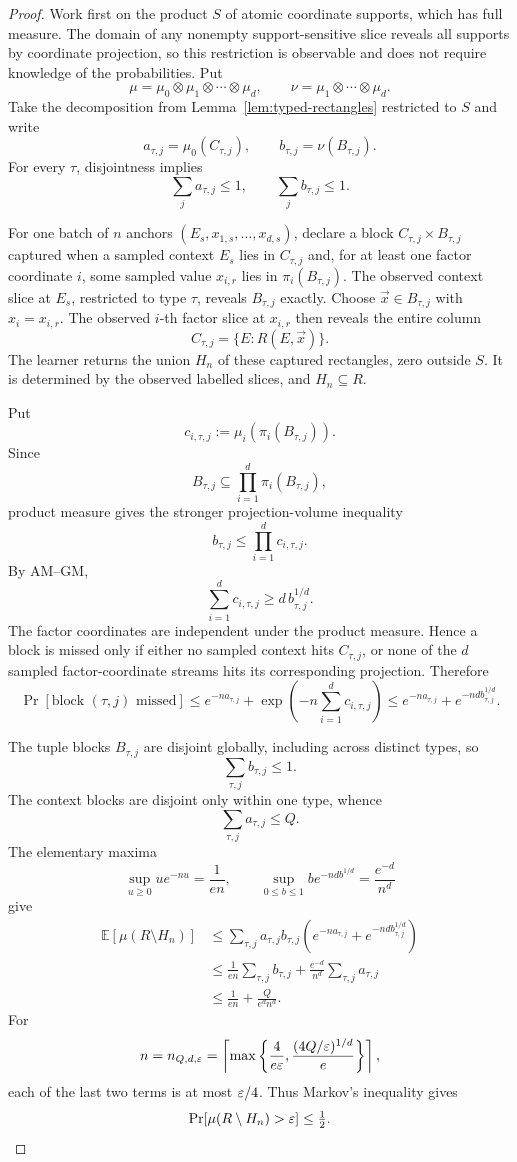 \begin{proof}
Work first on the product \(S\) of atomic coordinate supports,
which has full measure.  The domain of any nonempty
support-sensitive slice reveals all supports by coordinate
projection, so this restriction is observable and does not
require knowledge of the probabilities.
Put
\[
 \mu=\mu_0\otimes\mu_1\otimes\cdots\otimes\mu_d,
 \qquad \nu=\mu_1\otimes\cdots\otimes\mu_d.
\]
Take the decomposition from
Lemma~\ref{lem:typed-rectangles} restricted to \(S\) and write
\[
 a_{\tau,j}=\mu_0(C_{\tau,j}),\qquad
 b_{\tau,j}=\nu(B_{\tau,j}).
\]
For every \(\tau\), disjointness implies
\[
 \sum_j a_{\tau,j}\le 1,\qquad
 \sum_j b_{\tau,j}\le 1.
\]

For one batch of \(n\) anchors
\((E_s,x_{1,s},\ldots,x_{d,s})\), declare a block
\(C_{\tau,j}\times B_{\tau,j}\) captured when
a sampled context \(E_s\) lies in \(C_{\tau,j}\)
and, for at least one factor coordinate \(i\),
some sampled value \(x_{i,r}\) lies in
\(\pi_i(B_{\tau,j})\).  The observed context slice
at \(E_s\), restricted to type \(\tau\), reveals
\(B_{\tau,j}\) exactly.  Choose
\(\vec x\in B_{\tau,j}\) with \(x_i=x_{i,r}\).
The observed \(i\)-th factor slice at \(x_{i,r}\)
then reveals the entire column
\[
 C_{\tau,j}=\{E:R(E,\vec x)\}.
\]
The learner returns the union \(H_n\) of these
captured rectangles, zero outside \(S\).
It is determined by the observed labelled slices,
and \(H_n\subseteq R\).

Put
\[
 c_{i,\tau,j}:=\mu_i(\pi_i(B_{\tau,j})).
\]
Since
\[
 B_{\tau,j}
 \subseteq
 \prod_{i=1}^d \pi_i(B_{\tau,j}),
\]
product measure gives the stronger projection-volume inequality
\[
 b_{\tau,j}
 \le \prod_{i=1}^d c_{i,\tau,j}.
\]
By AM--GM,
\[
 \sum_{i=1}^d c_{i,\tau,j}
 \ge d\,b_{\tau,j}^{1/d}.
\]
The factor coordinates are independent under the
product measure.  Hence a block is missed only if
either no sampled context hits \(C_{\tau,j}\), or
none of the \(d\) sampled factor-coordinate streams
hits its corresponding projection.  Therefore
\[
 \Pr[\text{block }(\tau,j)\text{ missed}]
 \le e^{-n a_{\tau,j}}
   +\exp\!\left(-n\sum_{i=1}^d c_{i,\tau,j}\right)
 \le e^{-n a_{\tau,j}}
   +e^{-nd b_{\tau,j}^{1/d}}.
\]

The tuple blocks \(B_{\tau,j}\) are disjoint
globally, including across distinct types, so
\[
 \sum_{\tau,j}b_{\tau,j}\le1.
\]
The context blocks are disjoint only within one
type, whence
\[
 \sum_{\tau,j}a_{\tau,j}\le Q.
\]
The elementary maxima
\[
 \sup_{u\ge0}u e^{-nu}=\frac1{en},
 \qquad
 \sup_{0\le b\le1}
 b e^{-nd b^{1/d}}=\frac{e^{-d}}{n^d}
\]
give
\begin{align*}
 \mathbb E[\mu(R\setminus H_n)]
 &\le \sum_{\tau,j}a_{\tau,j}b_{\tau,j}
       \left(e^{-na_{\tau,j}}
       +e^{-nd b_{\tau,j}^{1/d}}\right)\\
 &\le \frac{1}{en}\sum_{\tau,j}b_{\tau,j}
      +\frac{e^{-d}}{n^d}\sum_{\tau,j}a_{\tau,j}\\
 &\le \frac{1}{en}+\frac{Q}{e^d n^d}.
\end{align*}
For
\[
 n=n_{Q,d,\varepsilon}
 =
 \left\lceil
 \max\left\{
 \frac{4}{e\varepsilon},
 \frac{(4Q/\varepsilon)^{1/d}}{e}
 \right\}
 \right\rceil,
\]
each of the last two terms is at most \(\varepsilon/4\).
Thus Markov's inequality gives
\[
 \Pr[\mu(R\setminus H_n)>\varepsilon]\le\tfrac12.
\]


\end{proof}
